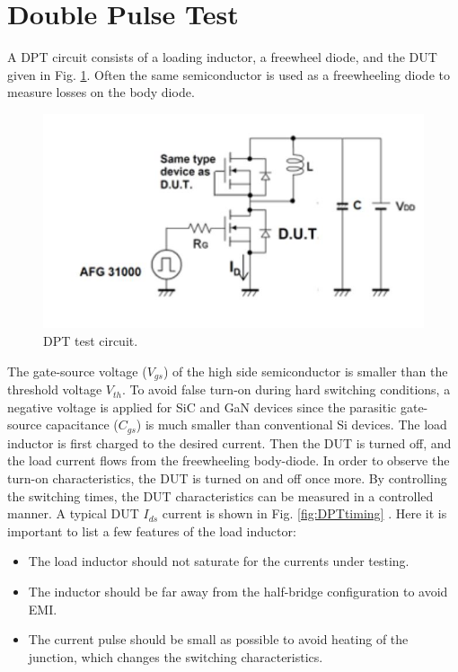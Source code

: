 \documentclass[12pt]{article} %
\begin{document}
\section{Double Pulse Test}

A DPT circuit consists of a loading inductor, a freewheel diode, and the DUT given in Fig. \ref{fig:DPTcircuit}. Often the same semiconductor is used as a freewheeling diode to measure losses on the body diode. 

\begin{figure}[h!]
	\includegraphics[scale=0.7]{figures/D_P_T.JPG}
	\caption{DPT test circuit.}
	\label{fig:DPTcircuit}
\end{figure}

The gate-source voltage ($V_{gs}$) of the high side semiconductor is smaller than the threshold voltage $V_{th}$. To avoid false turn-on during hard switching conditions, a negative voltage is applied for SiC and GaN devices since the parasitic gate-source capacitance ($C_{gs}$) is much smaller than conventional Si devices. The load inductor is first charged to the desired current. Then the DUT is turned off, and the load current flows from the freewheeling body-diode. In order to observe the turn-on characteristics, the DUT is turned on and off once more. By controlling the switching times, the DUT characteristics can be measured in a controlled manner. A typical DUT $I_{ds}$ current is shown in Fig. \ref{fig:DPTtiming} \cite{Infineon}.  Here it is important to list a few features of the load inductor:

\begin{itemize}
    \item The load inductor should not saturate for the currents under testing.
    \item The inductor should be far away from the half-bridge configuration to avoid EMI.
    \item The current pulse should be small as possible to avoid heating of the junction, which changes the switching characteristics.
\end{itemize}
\end{document}
